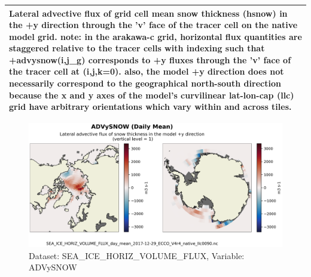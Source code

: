 \begin{longtable}{|m{}|m{}|m{}|m{}|}
\multicolumn{4}{|p{1\textwidth}|}{\footnotesize{{Lateral advective flux of grid cell mean snow thickness (hsnow) in the +y direction through the 'v' face of the tracer cell on the native model grid. note: in the arakawa-c grid, horizontal flux quantities are staggered relative to the tracer cells with indexing such that +advysnow(i,j\_g) corresponds to +y fluxes through the 'v' face of the tracer cell at (i,j,k=0). also, the model +y direction does not necessarily correspond to the geographical north-south direction because the x and y axes of the model's curvilinear lat-lon-cap (llc) grid have arbitrary orientations which vary within and across tiles.}}} \\ \hline
\end{longtable}

\begin{figure}[H]
\centering
\includegraphics[scale=0.55]{../images/plots/v4r4/native_plots/Sea-Ice_and_Snow_Horizontal_Volume_Fluxes/ADVySNOW.png}
\caption{Dataset: SEA\_ICE\_HORIZ\_VOLUME\_FLUX, Variable: ADVySNOW}
\label{tab:table-SEA_ICE_HORIZ_VOLUME_FLUX_ADVySNOW-Plot}
\end{figure}
\newpage
\pagebreak
